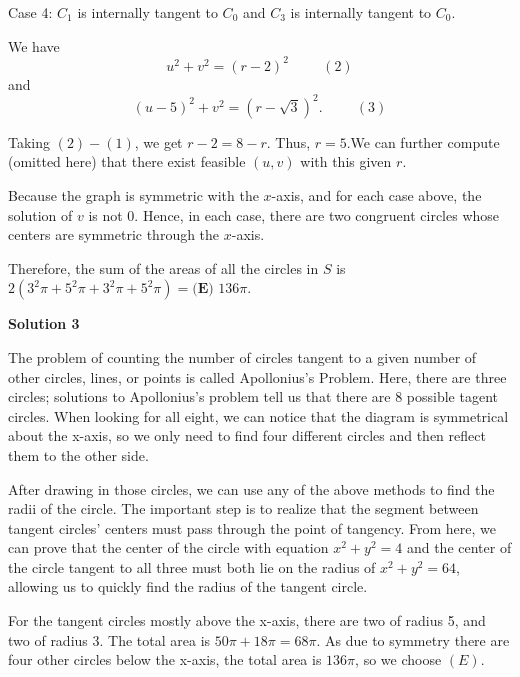\begin{enumerate}
 Case 4: $C_1$ is internally tangent to $C_0$ and $C_3$ is internally tangent to $C_0$.

 We have
 \[ u^2 + v^2 = \left( r - 2 \right)^2  \hspace{1cm} (2) \]and
 \[ (u-5)^2 + v^2 = \left( r - \sqrt{3} \right)^2 . \hspace{1cm} (3) \]

 Taking $(2) - (1)$, we get $r - 2 = 8 - r$. Thus, $r = 5$.We can further compute (omitted here) that there exist feasible $(u,v)$ with this given $r$.

 
Because the graph is symmetric with the $x$-axis, and for each case above, the solution of $v$ is not 0. Hence, in each case, there are two congruent circles whose centers are symmetric through the $x$-axis.

 Therefore, the sum of the areas of all the circles in $S$ is $2\left( 3^2 \pi +5^2 \pi +3^2 \pi +5^2 \pi \right) = \boxed{\textbf{(E) } 136 \pi}$.

 



\textbf{Solution 3}

The problem of counting the number of circles tangent to a given number of other circles, lines, or points is called Apollonius's Problem. Here, there are three circles; solutions to Apollonius's problem tell us that there are 8 possible tagent circles. When looking for all eight, we can notice that the diagram is symmetrical about the x-axis, so we only need to find four different circles and then reflect them to the other side. 

 After drawing in those circles, we can use any of the above methods to find the radii of the circle. The important step is to realize that the segment between tangent circles' centers must pass through the point of tangency. From here, we can prove that the center of the circle with equation $x^2 + y^2 = 4$ and the center of the circle tangent to all three must both lie on the radius of $x^2 + y^2 = 64$, allowing us to quickly find the radius of the tangent circle.

 For the tangent circles mostly above the x-axis, there are two of radius 5, and two of radius 3. The total area is $50 \pi + 18 \pi = 68 \pi$. As due to symmetry there are four other circles below the x-axis, the total area is $136 \pi$, so we choose $\boxed{ (E) }$. 

 


 



\end{enumerate}
